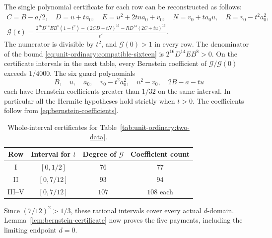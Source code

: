 The single polynomial certificate for each row can be
reconstructed as follows:
\[
 \begin{gathered}
 C=B-a/2,\quad D=u+ta_0,\quad E=u^2+2tua_0+v_0,\quad
 N=v_0+ta_0u,\quad R=v_0-t^2a_0^2,\\
 \mathcal G(t)=\frac{
  2^{16}D^{14}EB^8(1-t^2)
 -(2CD-tN)^{16}-RD^{14}(2C+tu)^{16}}{t^2}.
 \end{gathered}
\]
The numerator is divisible by \(t^2\), and \(\mathcal G(0)>1\) in
every row. The denominator of the bound
\eqref{eq:unit-ordinary:compatible-sixteen} is
\(2^{16}D^{14}EB^8>0\).
On the certificate intervals in the next table, every Bernstein
coefficient of \(\mathcal G/\mathcal G(0)\) exceeds \(1/4000\).
The six guard polynomials
\[
 B,\quad u,\quad a_0,\quad v_0-t^2a_0^2,
 \quad u^2-v_0,\quad 2B-a-tu
\]
each have Bernstein coefficients greater than \(1/32\) on the same
interval. In particular all the Hermite hypotheses hold strictly when
\(t>0\). The coefficients follow from
\eqref{eq:bernstein-coefficients}.
\begin{table}[htbp]\centering\small
\caption{Whole-interval certificates for Table~\ref{tab:unit-ordinary:two-data}.}
\label{tab:unit-ordinary:two-certificates}
\begin{tabular}{@{}cccc@{}}\toprule
Row & Interval for \(t\) & Degree of \(\mathcal G\) & Coefficient count\\\midrule
I & \([0,1/2]\) & \(76\) & \(77\)\\
II & \([0,7/12]\) & \(93\) & \(94\)\\
III--V & \([0,7/12]\) & \(107\) & \(108\) each\\\bottomrule
\end{tabular}
\end{table}
Since \((7/12)^2>1/3\), these rational intervals cover every actual
\(d\)-domain. Lemma~\ref{lem:bernstein-certificate} now proves the five
payments, including the limiting endpoint \(d=0\).

